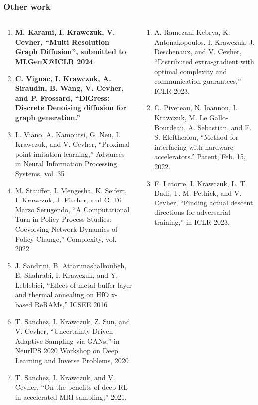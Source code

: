 \documentclass[./presentation.tex]{subfiles}
\begin{document}
\begin{frame}[label=done]
  \frametitle{Other work}
  \vspace{-1cm}
  \begin{columns}
    \begin{column}{0.5\textwidth}
      {
  \tiny
      \begin{enumerate}
       \item[0]  \textbf{M. Karami, I. Krawczuk, V. Cevher, “Multi Resolution Graph Diffusion”, submitted to MLGenX@ICLR 2024}
       \item[1]  \textbf{C. Vignac, I. Krawczuk, A. Siraudin, B. Wang, V. Cevher, and P. Frossard, “DiGress: Discrete Denoising diffusion for graph generation.”}
      \item [2] L. Viano, A. Kamoutsi, G. Neu, I. Krawczuk, and V. Cevher, “Proximal point imitation learning,” Advances in Neural Information Processing Systems, vol. 35
      \item [3] M. Stauffer, I. Mengesha, K. Seifert, I. Krawczuk, J. Fischer, and G. Di Marzo Serugendo, “A Computational Turn in Policy Process Studies: Coevolving Network Dynamics of Policy Change,” Complexity, vol. 2022 
      \item [4] J. Sandrini, B. Attarimashalkoubeh, E. Shahrabi, I. Krawczuk, and Y. Leblebici, “Effect of metal buffer layer and thermal annealing on HfO x-based ReRAMs,” ICSEE 2016
      \item [5] T. Sanchez, I. Krawczuk, Z. Sun, and V. Cevher, “Uncertainty-Driven Adaptive Sampling via GANs,” in NeurIPS 2020 Workshop on Deep Learning and Inverse Problems, 2020 
      \item [6] T. Sanchez, I. Krawczuk, and V. Cevher, “On the benefits of deep RL in accelerated MRI sampling,” 2021, 
\end{enumerate}
}
    \end{column}
    \begin{column}{0.5\textwidth}
    {
  \tiny
      \begin{enumerate}
      \item [8] A. Ramezani-Kebrya, K. Antonakopoulos, I. Krawczuk, J. Deschenaux, and V. Cevher, “Distributed extra-gradient with optimal complexity and communication guarantees,” ICLR 2023. 
      \item [9] C. Piveteau, N. Ioannou, I. Krawczuk, M. Le Gallo-Bourdeau, A. Sebastian, and E. S. Eleftheriou, “Method for interfacing with hardware accelerators.” Patent, Feb. 15, 2022. 
      \item [10] F. Latorre, I. Krawczuk, L. T. Dadi, T. M. Pethick, and V. Cevher, “Finding actual descent directions for adversarial training,” in ICLR 2023. 

\end{enumerate}}
\end{column}
\end{columns}
\end{frame}
\end{document}

